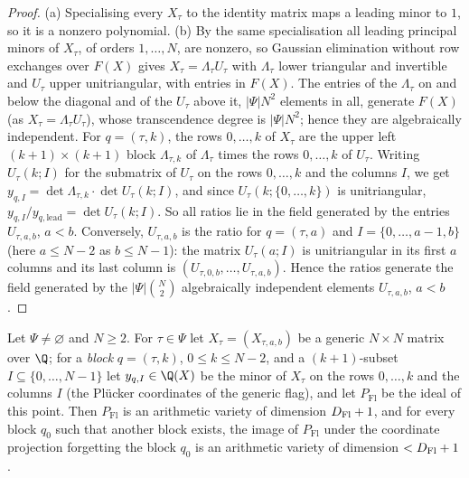 \begin{proof}
(a) Specialising every $X_\tau$ to the identity matrix maps a leading minor to $1$, so it is a nonzero polynomial.
(b) By the same specialisation all leading principal minors of $X_\tau$, of orders $1,\dots,N$, are nonzero, so Gaussian
elimination without row exchanges over $F(X)$ gives $X_\tau=\Lambda_\tau U_\tau$ with $\Lambda_\tau$ lower triangular and invertible
and $U_\tau$ upper unitriangular, with entries in $F(X)$. The entries of the $\Lambda_\tau$ on and below the diagonal and of
the $U_\tau$ above it, $|\Psi|N^2$ elements in all, generate $F(X)$ (as $X_\tau=\Lambda_\tau U_\tau$), whose transcendence degree
is $|\Psi|N^2$; hence they are algebraically independent. For $q=(\tau,k)$, the rows $0,\dots,k$ of $X_\tau$ are the upper
left $(k+1)\times(k+1)$ block $\Lambda_{\tau,k}$ of $\Lambda_\tau$ times the rows $0,\dots,k$ of $U_\tau$. Writing $U_\tau(k;I)$ for the
submatrix of $U_\tau$ on the rows $0,\dots,k$ and the columns $I$, we get $y_{q,I}=\det\Lambda_{\tau,k}\cdot\det U_\tau(k;I)$, and
since $U_\tau(k;\{0,\dots,k\})$ is unitriangular, $y_{q,I}/y_{q,\mathrm{lead}}=\det U_\tau(k;I)$. So all ratios lie in the field
generated by the entries $U_{\tau,a,b}$, $a<b$. Conversely, $U_{\tau,a,b}$ is the ratio for $q=(\tau,a)$ and
$I=\{0,\dots,a-1,b\}$ (here $a\le N-2$ as $b\le N-1$): the matrix $U_\tau(a;I)$ is unitriangular in its first $a$ columns
and its last column is $(U_{\tau,0,b},\dots,U_{\tau,a,b})$. Hence the ratios generate the field generated by the
$|\Psi|\binom N2$ algebraically independent elements $U_{\tau,a,b}$, $a<b$.
\end{proof}

\begin{proposition}\label{prop:pf:deepstr:flagdrop}
Let $\Psi\ne\varnothing$ and $N\ge2$. For $\tau\in\Psi$ let $X_\tau=(X_{\tau,a,b})$ be a generic $N\times N$ matrix over $\Q$; for a
\emph{block} $q=(\tau,k)$, $0\le k\le N-2$, and a $(k+1)$-subset $I\subseteq\{0,\dots,N-1\}$ let $y_{q,I}\in\Q(X)$ be the minor of
$X_\tau$ on the rows $0,\dots,k$ and the columns $I$ (the Pl\"ucker coordinates of the generic flag), and let $P_{\mathrm{Fl}}$ be
the ideal of this point. Then $P_{\mathrm{Fl}}$ is an arithmetic variety of dimension $D_{\mathrm{Fl}}+1$, and for every block
$q_0$ such that another block exists, the image of $P_{\mathrm{Fl}}$ under the coordinate projection forgetting the block
$q_0$ is an arithmetic variety of dimension $<D_{\mathrm{Fl}}+1$.
\end{proposition}

